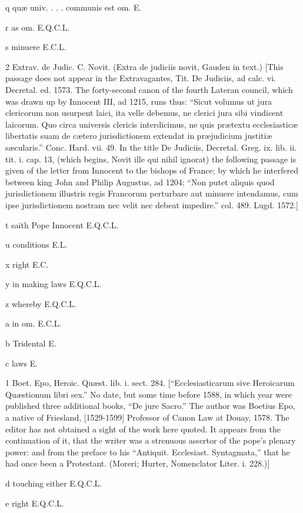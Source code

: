 q
quæ univ. . . . communis est om. E.

r
as om. E.Q.C.L.

s
minuere E.C.L.

2
Extrav. de Judic. C. Novit. (Extra de judiciis novit, Gauden in text.) [This passage does not appear in the Extravagantes, Tit. De Judiciis, ad calc. vi. Decretal. ed. 1573. The forty-second canon of the fourth Lateran council, which was drawn up by Innocent III, ad 1215, runs thus: “Sicut volumus ut jura clericorum non usurpent laici, ita velle debemus, ne clerici jura sibi vindicent laicorum. Quo circa universis clericis interdicimus, ne quis prætextu ecclesiasticæ libertatis suam de cætero jurisdictionem extendat in præjudicium justitiæ sæcularis.” Conc. Hard. vii. 49. In the title De Judiciis, Decretal. Greg. ix. lib. ii. tit. i. cap. 13, (which begins, Novit ille qui nihil ignorat) the following passage is given of the letter from Innocent to the bishops of France; by which he interfered between king John and Philip Augustus, ad 1204; “Non putet aliquis quod jurisdictionem illustris regis Francorum perturbare aut minuere intendamus, cum ipse jurisdictionem nostram nec velit nec debeat impedire.” col. 489. Lugd. 1572.]

t
saith Pope Innocent E.Q.C.L.

u
conditions E.L.

x
right E.C.

y
in making laws E.Q.C.L.

z
whereby E.Q.C.L.

a
in om. E.C.L.

b
Tridental E.

c
laws E.

1
Boet. Epo, Heroic. Quæst. lib. i. sect. 284. [“Ecclesiasticarum sive Heroicarum Quæstionum libri sex.” No date, but some time before 1588, in which year were published three additional books, “De jure Sacro.” The author was Boetius Epo, a native of Friesland, [1529-1599] Professor of Canon Law at Douay, 1578. The editor has not obtained a sight of the work here quoted. It appears from the continuation of it, that the writer was a strenuous assertor of the pope’s plenary power: and from the preface to his “Antiquit. Ecclesiast. Syntagmata,” that he had once been a Protestant. (Moreri; Hurter, Nomenclator Liter. i. 228.)]

d
touching either E.Q.C.L.

e
right E.Q.C.L.

